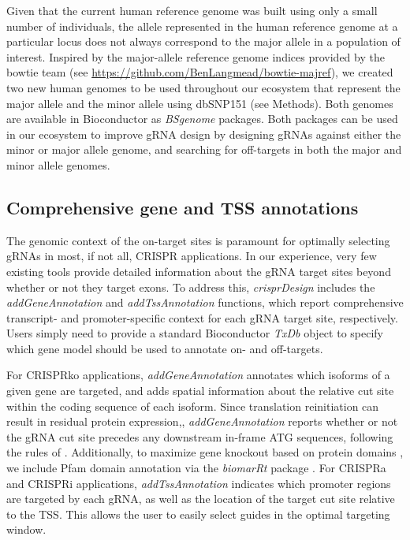\documentclass[pdftex,english,10pt]{article}
\begin{document}
Given that the current human reference genome was built using only a small number of individuals, the allele represented in the human reference genome at a particular locus does not always correspond to the major allele in a population of interest. Inspired by the major-allele reference genome indices provided by the bowtie team (see \url{https://github.com/BenLangmead/bowtie-majref}), we created two new human genomes to be used throughout our ecosystem that represent the major allele and the minor allele using dbSNP151 (see Methods). Both genomes are available in Bioconductor as \textit{BSgenome} packages. Both packages can be used in our ecosystem to improve gRNA design by designing gRNAs against either the minor or major allele genome, and searching for off-targets in both the major and minor allele genomes. 





\subsection{Comprehensive gene and TSS annotations}

The genomic context of the on-target sites is paramount for optimally selecting gRNAs in most, if not all, CRISPR applications. 
In our experience, very few existing tools provide detailed information about the gRNA target sites beyond whether or not they target exons.
To address this, \textit{crisprDesign} includes the \textit{addGeneAnnotation} and \textit{addTssAnnotation} functions, which report comprehensive transcript- and promoter-specific context for each gRNA target site, respectively. 
Users simply need to provide a standard Bioconductor \textit{TxDb} object to specify which gene model should be used to annotate on- and off-targets.

For CRISPRko applications, \textit{addGeneAnnotation} annotates which isoforms of a given gene are targeted, and adds spatial information about the relative cut site within the coding sequence of each isoform. Since translation reinitiation can result in residual protein expression,\citep{smits2019biological}, \textit{addGeneAnnotation} reports whether or not the gRNA cut site precedes any downstream in-frame ATG sequences, following the rules of \citet{cohen2019nonsense}.
 Additionally, to maximize gene knockout based on protein domains \citep{he2019novo}, we include Pfam domain annotation \citep{pfam} via the \textit{biomarRt} package \citep{biomart}. For CRISPRa and CRISPRi applications, \textit{addTssAnnotation} indicates which promoter regions are targeted by each gRNA, as well as the location of the target cut site relative to the TSS. This allows the user to easily select guides in the optimal targeting window. 
 
\end{document}
